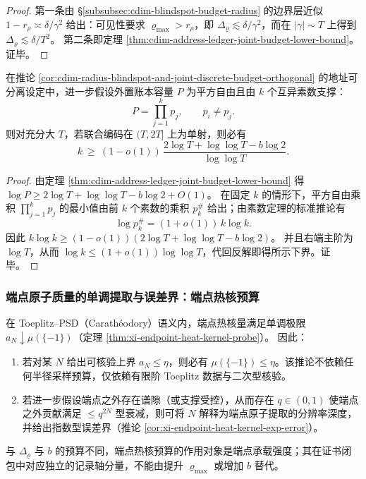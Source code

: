 \begin{proof}
第一条由 \S\ref{subsubsec:cdim-blindspot-budget-radius} 的边界层近似 \(1-r_\rho\asymp \delta/\gamma^2\) 给出：可见性要求 \(\varrho_{\max}>r_\rho\)，即 \(\Delta_{\varrho}\lesssim \delta/\gamma^2\)，而在 \(|\gamma|\sim T\) 上得到 \(\Delta_{\varrho}\lesssim \delta/T^2\)。
第二条即定理 \ref{thm:cdim-address-ledger-joint-budget-lower-bound}。证毕。
\end{proof}

\begin{corollary}\label{cor:cdim-ledger-prime-support-min-growth}
在推论 \ref{cor:cdim-radius-blindspot-and-joint-discrete-budget-orthogonal} 的地址可分离设定中，进一步假设外置账本容量 \(P\) 为平方自由且由 \(k\) 个互异素数支撑：
\[
P=\prod_{j=1}^{k} p_j,\qquad p_i\neq p_j.
\]
则对充分大 \(T\)，若联合编码在 \((T,2T]\) 上为单射，则必有
\[
k\ \ge\ (1-o(1))\,
\frac{2\log T+\log\log T-b\log 2}{\log\log T}.
\]
\end{corollary}

\begin{proof}
由定理 \ref{thm:cdim-address-ledger-joint-budget-lower-bound} 得 \(\log P\ge 2\log T+\log\log T-b\log 2+O(1)\)。
在固定 \(k\) 的情形下，平方自由乘积 \(\prod_{j=1}^{k}p_j\) 的最小值由前 \(k\) 个素数的乘积 \(p_k^\#\) 给出；由素数定理的标准推论有
\[
\log p_k^\#=(1+o(1))\,k\log k.
\]
因此
\(
k\log k\ge (1-o(1))(2\log T+\log\log T-b\log 2)
\)。
并且右端主阶为 \(\log T\)，从而 \(\log k\le (1+o(1))\log\log T\)，代回反解即得所示下界。证毕。
\end{proof}

\subsubsection{端点原子质量的单调提取与误差界：端点热核预算}\label{subsubsec:cdim-blindspot-budget-endpoint-atom}
在 Toeplitz--PSD（Carath\'eodory）语义内，端点热核量满足单调极限 \(a_N\downarrow\mu(\{-1\})\)（定理 \ref{thm:xi-endpoint-heat-kernel-probe}）。
因此：
\begin{enumerate}
  \item 若对某 \(N\) 给出可核验上界 \(a_N\le \eta\)，则必有 \(\mu(\{-1\})\le \eta\)。该推论不依赖任何半径采样预算，仅依赖有限阶 Toeplitz 数据与二次型核验。
  \item 若进一步假设端点之外存在谱隙（或支撑受控），从而存在 \(q\in(0,1)\) 使端点之外贡献满足 \(\le q^{2N}\) 型衰减，则可将 \(N\) 解释为端点原子提取的分辨率深度，并给出指数型误差界（推论 \ref{cor:xi-endpoint-heat-kernel-exp-error}）。
\end{enumerate}
与 \(\Delta_{\varrho}\) 与 \(b\) 的预算不同，端点热核预算的作用对象是端点承载强度；其在证书闭包中对应独立的记录轴分量，不能由提升 \(\varrho_{\max}\) 或增加 \(b\) 替代。

